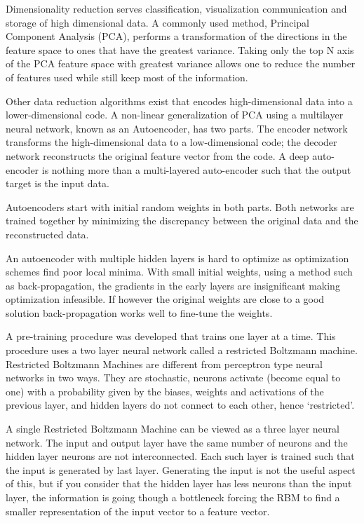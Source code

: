         
        
        
Dimensionality reduction serves classification, visualization communication and storage of high dimensional data\citep{hinton2006reducing}.
A commonly used method, Principal Component Analysis (PCA), performs a transformation of the directions in the feature space to ones that have the greatest variance.
Taking only the top N axis of the PCA feature space with greatest variance allows one to reduce the number of features used while still keep most of the information.

Other data reduction algorithms exist that encodes high-dimensional data into a lower-dimensional code.
A non-linear generalization of PCA using a multilayer neural network, known as an Autoencoder, has two parts.
The encoder network transforms the high-dimensional data to a low-dimensional code; the decoder network reconstructs the original feature vector from the code\citep{hinton2006reducing}.
A deep auto-encoder is nothing more than a multi-layered auto-encoder such that the output target is the input data\citep{dengthree}.

Autoencoders start with initial random weights in both parts.
Both networks are trained together by minimizing the discrepancy between the original data and the reconstructed data.

An autoencoder with multiple hidden layers is hard to optimize as optimization schemes find poor local minima.
With small initial weights, using a method such as back-propagation, the gradients in the early layers are insignificant making optimization infeasible.
If however the original weights are close to a good solution back-propagation works well to fine-tune the weights\citep{hinton2006reducing}.

A pre-training procedure was developed that trains one layer at a time.
This procedure uses a two layer neural network called a restricted Boltzmann machine\citep{hinton2006reducing}\citep{ackley1985learning}\citep{hinton2010practical}.
Restricted Boltzmann Machines are different from perceptron type neural networks in two ways.
They are stochastic, neurons activate (become equal to one) with a probability given by the biases, weights and activations of the previous layer, and hidden layers do not connect to each other, hence `restricted'.

A single Restricted Boltzmann Machine can be viewed as a three layer neural network.
The input and output layer have the same number of neurons and the hidden layer neurons are not interconnected.
Each such layer is trained such that the input is generated by last layer.
Generating the input is not the useful aspect of this, but if you consider that the hidden layer has less neurons than the input layer, the information is going though a bottleneck forcing the RBM to find a smaller representation of the input vector to a feature vector.

